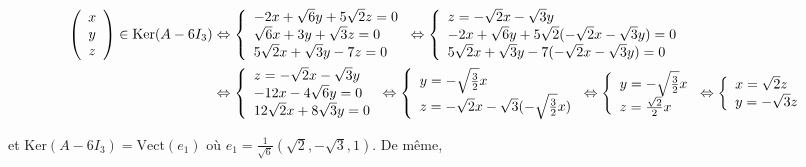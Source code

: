 {\begin{enumerate}
{\begin{align*}\ensuremath
\left(
\begin{array}{c}
x\\
y\\
z
\end{array}
\right)\in\text{Ker}(A-6I_3)&\Leftrightarrow\left\{
\begin{array}{l}
-2x+\sqrt{6}y+5\sqrt{2}z=0\\
\sqrt{6}x+3y+\sqrt{3}z=0\\
5\sqrt{2}x+\sqrt{3}y-7z=0
\end{array}
\right.\Leftrightarrow\left\{
\begin{array}{l}
z=-\sqrt{2}x-\sqrt{3}y\\
-2x+\sqrt{6}y+5\sqrt{2}(-\sqrt{2}x-\sqrt{3}y)=0\\
5\sqrt{2}x+\sqrt{3}y-7(-\sqrt{2}x-\sqrt{3}y)=0
\end{array}
\right.\\
 &\Leftrightarrow\left\{
\begin{array}{l}
z=-\sqrt{2}x-\sqrt{3}y\\
-12x-4\sqrt{6}y=0\\
12\sqrt{2}x+8\sqrt{3}y=0
\end{array}
\right.\Leftrightarrow\left\{
\begin{array}{l}
y=-\sqrt{\frac{3}{2}}x\\
z=-\sqrt{2}x-\sqrt{3}(-\sqrt{\frac{3}{2}}x)
\end{array}
\right.\Leftrightarrow\left\{
\begin{array}{l}
y=-\sqrt{\frac{3}{2}}x\\
z=\frac{\sqrt{2}}{2}x
\end{array}
\right.\Leftrightarrow\left\{
\begin{array}{l}
x=\sqrt{2}z\\
y=-\sqrt{3}{z}
\end{array}
\right.
\end{align*}

et $\text{Ker}(A-6I_3) =\text{Vect}(e_1)$ où $e_1=\frac{1}{\sqrt{6}}(\sqrt{2},-\sqrt{3},1)$. De même,

}
\end{enumerate}}
